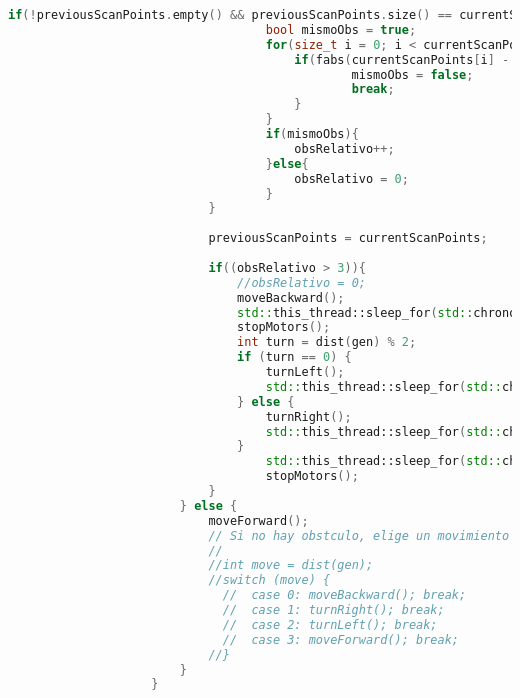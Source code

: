 \begin{lstlisting}[language={C++}, caption={Segundo ajuste de c\'odigo}, label={SegundoAjuste}]
                            if(!previousScanPoints.empty() && previousScanPoints.size() == currentScanPoints.size()){
                                    bool mismoObs = true;
                                    for(size_t i = 0; i < currentScanPoints.size(); ++i){
                                        if(fabs(currentScanPoints[i] - previousScanPoints[i]) > 0.05){
                                                mismoObs = false;
                                                break;
                                        }
                                    }
                                    if(mismoObs){
                                        obsRelativo++;
                                    }else{
                                        obsRelativo = 0;
                                    }
                            }
                            
                            previousScanPoints = currentScanPoints;
                            
                            if((obsRelativo > 3)){
                                //obsRelativo = 0;
                                moveBackward();
                                std::this_thread::sleep_for(std::chrono::seconds(3));
                                stopMotors();
                                int turn = dist(gen) % 2;
                                if (turn == 0) {
                                    turnLeft();
                                    std::this_thread::sleep_for(std::chrono::seconds(5));
                                } else {
                                    turnRight();
                                    std::this_thread::sleep_for(std::chrono::seconds(5));
                                }
                                    std::this_thread::sleep_for(std::chrono::seconds(2));
                                    stopMotors();
                            }
                        } else {
                            moveForward();
                            // Si no hay obstculo, elige un movimiento aleatorio
                            //
                            //int move = dist(gen);
                            //switch (move) {
                              //  case 0: moveBackward(); break;
                              //  case 1: turnRight(); break;
                              //  case 2: turnLeft(); break;
                              //  case 3: moveForward(); break;
                            //}
                        }
                    }
                    

\end{lstlisting}
